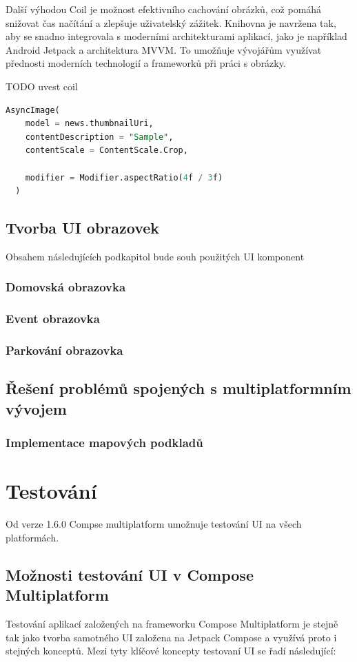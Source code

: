 Další výhodou Coil je možnost efektivního cachování obrázků, což pomáhá snižovat čas načítání a zlepšuje uživatelský zážitek. Knihovna je navržena tak, 
aby se snadno integrovala s moderními architekturami aplikací, jako je například Android Jetpack a architektura MVVM. To umožňuje vývojářům využívat 
přednosti moderních technologií a frameworků při práci s obrázky.

TODO uvest coil
\begin{lstlisting}[caption={Coil}, label={lst:Coil3}, language=SQL]
  AsyncImage(
    model = news.thumbnailUri,
    contentDescription = "Sample",
    contentScale = ContentScale.Crop,

    modifier = Modifier.aspectRatio(4f / 3f)
  )
\end{lstlisting}


\section{Tvorba UI obrazovek}
Obsahem následujících podkapitol bude souh použitých UI komponent
\subsection{Domovská obrazovka}
\subsection{Event obrazovka}
\subsection{Parkování obrazovka}



\section{Řešení problémů spojených s multiplatformním vývojem}
\subsection{Implementace mapových podkladů}


\chapter{Testování}
Od verze 1.6.0 Compse multiplatform umožnuje testování UI na všech platformách. \cite{composeNews1.6.0}

\section{Možnosti testování UI v Compose Multiplatform}
Testování aplikací založených na frameworku Compose Multiplatform je stejně tak jako tvorba samotného UI založena na Jetpack Compose a využívá 
proto i stejných konceptů. Mezi tyty klíčové koncepty testovaní UI se řadí následující:


